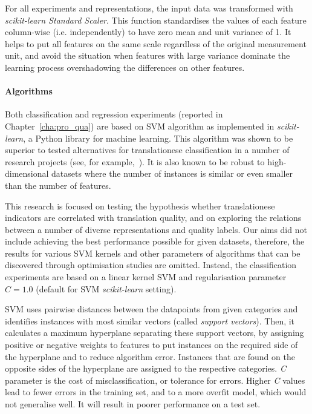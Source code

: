 For all experiments and representations, the input data was transformed with \textit{scikit-learn Standard Scaler}. This function standardises the values of each feature column-wise (i.e. independently) to have zero mean and unit variance of 1. It helps to put all features on the same scale regardless of the original measurement unit, and avoid the situation when features with large variance dominate the learning process overshadowing the differences on other features.

\paragraph{Algorithms} Both classification and regression experiments (reported in Chapter~\ref{cha:pro_qua}) are based on \gls{SVM} algorithm as implemented in \textit{scikit-learn}, a Python library for machine learning. 
This algorithm was shown to be superior to tested alternatives for translationese classification in a number of research projects (see, for example,~\cite{Ilisei2010}). It is also known to be robust to high-dimensional datasets where the number of instances is similar or even smaller than the number of features.

This research is focused on testing the hypothesis whether translationese indicators are correlated with translation quality, and on exploring the relations between a number of diverse representations and quality labels. Our aims did not include achieving the best performance possible for given datasets, therefore, the results for various SVM kernels and other parameters of algorithms that can be discovered through optimisation studies are omitted. 
Instead, the classification experiments are based on a linear kernel SVM and regularisation parameter $C=1.0$ (default for SVM \textit{scikit-learn} setting).

SVM uses pairwise distances between the datapoints from given categories and identifies instances with most similar vectors (called \textit{support vectors}). Then, it calculates a maximum hyperplane separating these support vectors, by assigning positive or negative weights to features to put instances on the required side of the hyperplane and to reduce algorithm error. Instances that are found on the opposite sides of the hyperplane are assigned to the respective categories. 
\textit{C} parameter is the cost of misclassification, or tolerance for errors. Higher \textit{C} values lead to fewer errors in the training set, and to a more overfit model, which would not generalise well. It will result in poorer performance on a test set.
%

